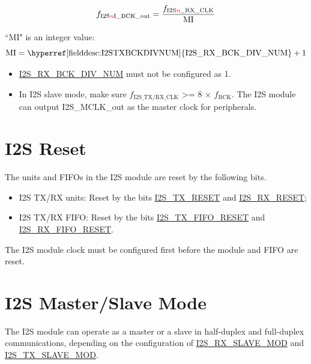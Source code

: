 \documentclass[main\_\_EN.tex]{subfiles}
\begin{document}
$$f_{\textrm{I2S\textcolor{red}{\it{n}}I\_BCK\_out}} = \frac{f_{\textrm{I2S\textcolor{red}{\it{n}}\_RX\_CLK}}}{\textrm{MI}}$$

``MI" is an integer value:
$$ \textrm{MI} = \textrm{\hyperref[fielddesc:I2STXBCKDIVNUM]{I2S\_RX\_BCK\_DIV\_NUM}} + 1 $$

\begin{tiplisting}
\vspace{-2em}
\begin{itemize}
    \item \hyperref[fielddesc:I2SRXBCKDIVNUM]{I2S\_RX\_BCK\_DIV\_NUM} must not be configured as 1.
    \item In I2S slave mode, make sure $f_{\textrm{I2S\_TX/RX\_CLK}}$ >= 8 × $f_{\textrm{BCK}}$. The I2S module can output I2S\_MCLK\_out as the master clock for peripherals.
\end{itemize}
\end{tiplisting}

\section{I2S Reset}\label{sec:i2s-reset}

The units and FIFOs in the I2S module are reset by the following bits.

\begin{itemize}
\item I2S TX/RX units: Reset by the bits \hyperref[fielddesc:I2STXRESET]{I2S\_TX\_RESET} and  \hyperref[fielddesc:I2SRXRESET]{I2S\_RX\_RESET};
\item I2S TX/RX FIFO: Reset by the bits \hyperref[fielddesc:I2STXFIFORESET]{I2S\_TX\_FIFO\_RESET} and \hyperref[fielddesc:I2SRXFIFORESET]{I2S\_RX\_FIFO\_RESET}.
\end{itemize}

\begin{tiplisting}
The I2S module clock must be configured first before the module and FIFO are reset.
\end{tiplisting} 

\section{I2S Master/Slave Mode}

The \chipname{} I2S module can operate as a master or a slave in half-duplex and full-duplex communications, depending on the configuration of  \hyperref[fielddesc:I2SRXSLAVEMOD]{I2S\_RX\_SLAVE\_MOD} and  \hyperref[fielddesc:I2STXSLAVEMOD]{I2S\_TX\_SLAVE\_MOD}.
\end{document}
